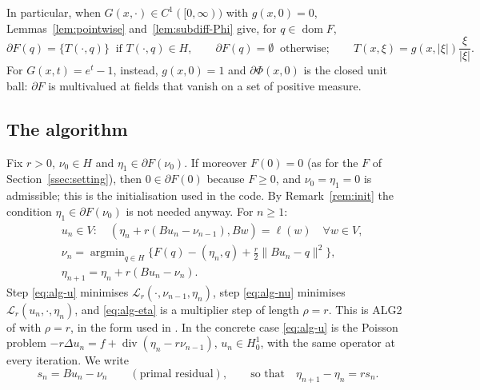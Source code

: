 \documentclass[11pt]{amsart}
\theoremstyle{definition}
\theoremstyle{remark}
\numberwithin{equation}{section}
\newcommand{\Lag}{\mathcal{L}_r}
\newcommand{\abs}[1]{\lvert #1\rvert}
\newcommand{\norm}[1]{\lVert #1\rVert}
\DeclareMathOperator{\dom}{dom}
\DeclareMathOperator{\divg}{div}
\DeclareMathOperator*{\argmin}{argmin}
\begin{document}
In particular, when $G(x,\cdot)\in C^1([0,\infty))$ with $g(x,0)=0$, Lemmas~\ref{lem:pointwise} and~\ref{lem:subdiff-Phi} give, for $q\in\dom F$,
\begin{equation}\label{eq:dF-C1}
\partial F(q)=\{T(\cdot,q)\}\ \text{ if } T(\cdot,q)\in H,\qquad \partial F(q)=\emptyset\ \text{ otherwise};\qquad T(x,\xi)=g(x,\abs\xi)\frac{\xi}{\abs\xi}.
\end{equation}
For $G(x,t)=e^t-1$, instead, $g(x,0)=1$ and $\partial\Phi(x,0)$ is the closed unit ball: $\partial F$ is multivalued at fields that vanish on a set of positive measure.

\subsection{The algorithm}\label{ssec:algorithm}
Fix $r>0$, $\nu_0\in H$ and $\eta_1\in\partial F(\nu_0)$. If moreover $F(0)=0$ (as for the $F$ of Section~\ref{ssec:setting}), then $0\in\partial F(0)$ because $F\ge0$, and $\nu_0=\eta_1=0$ is admissible; this is the initialisation used in the code. By Remark~\ref{rem:init} the condition $\eta_1\in\partial F(\nu_0)$ is not needed anyway. For $n\ge1$:
\begin{align}
&u_n\in V:\quad (\eta_n+r(Bu_n-\nu_{n-1}),Bw)=\ell(w)\quad\forall w\in V,\label{eq:alg-u}\\
&\nu_n=\argmin_{q\in H}\Big\{F(q)-(\eta_n,q)+\frac r2\norm{Bu_n-q}^2\Big\},\label{eq:alg-nu}\\
&\eta_{n+1}=\eta_n+r(Bu_n-\nu_n).\label{eq:alg-eta}
\end{align}
Step \eqref{eq:alg-u} minimises $\Lag(\cdot,\nu_{n-1},\eta_n)$, step \eqref{eq:alg-nu} minimises $\Lag(u_n,\cdot,\eta_n)$, and \eqref{eq:alg-eta} is a multiplier step of length $\rho=r$. This is ALG2 of \cite{FortinGlowinski1983ChIII,Glowinski1984ChVI} with $\rho=r$, in the form used in \cite{AragonFBRubio2023}. In the concrete case \eqref{eq:alg-u} is the Poisson problem $-r\Delta u_n=f+\divg(\eta_n-r\nu_{n-1})$, $u_n\in H^1_0$, with the same operator at every iteration. We write
\[
s_n=Bu_n-\nu_n\qquad(\text{primal residual}),\qquad\text{so that}\quad \eta_{n+1}-\eta_n=rs_n .
\]
\end{document}
